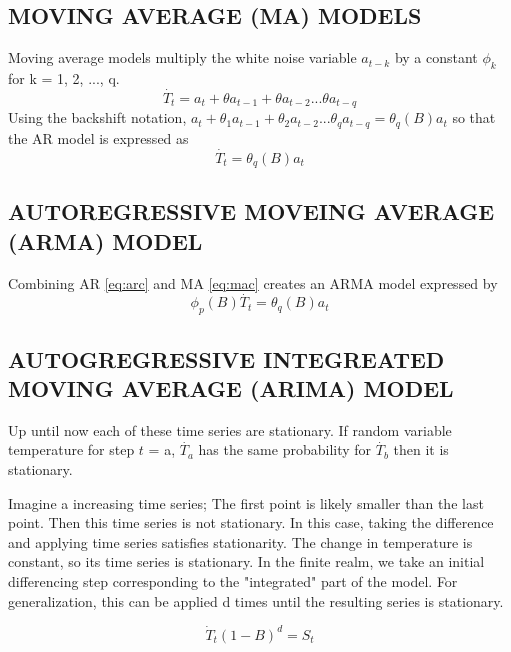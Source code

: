 \subsection{MOVING AVERAGE (MA) MODELS}

Moving average models multiply the white noise variable $a_{t-k}$ by a constant $\phi_k$ for k = 1, 2, ..., q.
\begin{equation}
\dot{T_{t}} = a_t + \theta a_{t-1} + \theta a_{t-2} ... \theta a_{t-q}
\end{equation}
Using the backshift notation, $a_t + \theta_1 a_{t-1} + \theta_2 a_{t-2} ... \theta_q a_{t-q} = \theta_q(B)a_t$ so that the AR model is expressed as
\begin{equation}\label{eq:mac}
\dot{T_{t}} = \theta_q(B)a_t
\end{equation}

\subsection{AUTOREGRESSIVE MOVEING AVERAGE (ARMA) MODEL}

Combining AR \ref{eq:arc} and MA \ref{eq:mac} creates an ARMA model expressed by
\begin{equation}
\phi_p(B) \dot{T_{t}} = \theta_q(B)a_t
\end{equation}

\subsection{AUTOGREGRESSIVE INTEGREATED MOVING AVERAGE (ARIMA) MODEL}

Up until now each of these time series are stationary. If random variable temperature for step $t$ = a, $\dot{T_{a}}$ has the same probability for $\dot{T_{b}}$ then it is stationary.

Imagine a increasing time series; The first point is likely smaller than the last point. Then this time series is not stationary. In this case, taking the difference and applying time series satisfies stationarity. The change in temperature is constant, so its time series is stationary. In the finite realm, we take an initial differencing step corresponding to the "integrated" part of the model. For generalization, this can be applied d times until the resulting series is stationary.

\begin{equation}
\dot{T}_{t}(1 - B)^d = S_{t}
\end{equation}

